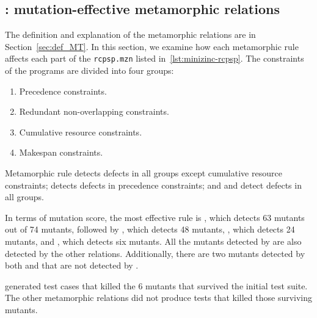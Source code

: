 \subsection{\rqidentifying: mutation-effective metamorphic relations}

The definition and explanation of the metamorphic relations are in
Section~\ref{sec:def_MT}. In this section, we examine how each
metamorphic rule affects each part of the \lstinline|rcpsp.mzn| listed
in~\ref{lst:minizinc-rcpsp}. The constraints of the programs are
divided into four groups:

\begin{enumerate}
\item\label{item:precdence} Precedence constraints.
\item\label{item:redundant} Redundant non-overlapping constraints.
\item\label{item:cumulative} Cumulative resource constraints.
\item\label{item:makespan} Makespan constraints.
\end{enumerate}

Metamorphic rule  detects defects in all groups except
cumulative resource constraints;  detects defects in precedence
constraints; and  and  detect defects in all groups.

In terms of mutation score, the most effective rule is ,
which detects 63 mutants out of 74 mutants,
followed by , which detects 48
mutants, , which detects 24 mutants, and , which detects
six mutants. All the mutants detected by  are also detected by
the other relations. Additionally, there are two mutants detected by both 
and  that are not detected by .

 generated test cases that killed the 6 mutants that survived the initial test suite. The other metamorphic relations did not produce tests that killed those surviving mutants. %

